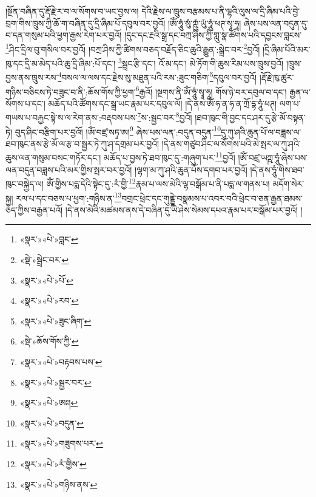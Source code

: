 །སྔོན་བཞིན་དུ་རྡོ་རྗེ་ར་བ་ལ་སོགས་བ་ཡང་བྱས་ལ། དེའི་རྗེས་ལ་ཁྲུས་བརྩམས་པ་ནི་ལྷའི་ལུས་ལ་དྲི་ཞིམ་པའི་བྱེ་བྲག་གིས་ཁྲུས་ཀྱི་ཆོ་ག་བཞིན་དུ་དྲི་ཞིམ་པོ་དབུལ་བར་བྱའོ། །ཨོཾ་ཧཱུཾ་སུཾ་ཀྵུཾ་ཡུཾ་ཧཱུཾ་ཕཊ་སྭཱ་ཧཱ། ཞེས་པས་ལན་བདུན་དུ་བ་དན་གསུམ་པའི་ཕྱག་རྒྱས་རེག་པར་བྱའོ། །དུང་དང་རྔའི་སྒྲ་དང་བཀྲ་ཤིས་ཀྱི་གླུ་སྣ་ཚོགས་པའི་དབྱངས་བླངས་\footnote{«སྣར་»«པེ་»བླང་}ཤིང་དྲིལ་བུ་གསིལ་བར་བྱའོ། །བཀྲ་ཤིས་ཀྱི་ཚིགས་བཅད་བརྗོད་ཅིང་ཆུའི་རྒྱུན་:སྒྲེང་བར་\footnote{«སྡེ་»སྦྲེང་བར་}བྱའོ། །དྲི་ཞིམ་པོའི་མར་ཁུ་དང་དྲི་མ་མེད་པའི་ཆུ་དྲི་ཞིམ་:པོ་དང་། \footnote{«སྣར་»«པེ་»པོ་}སྦྲང་རྩི་དང་། འོ་མ་དང་། མེ་ཏོག་གི་ཆུས་རིམ་པས་ཁྲུས་བྱའོ། །ཁྲུས་བྱས་ནས་ཁྲུས་རས་\footnote{«སྣར་»«པེ་»རབ་}བསལ་ལ་ལས་དང་རྗེས་སུ་མཐུན་པའི་རས་:ཟུང་གཅིག་\footnote{«སྣར་»«པེ་»ཟུང་ཞིག་}དབུལ་བར་བྱའོ། །རྡོ་རྗེ་ཁུ་ཚུར་གཉིས་བཅིངས་ཏེ་བཟུང་བ་ནི་:ཆོས་གོས་ཀྱི་ཕྱག་\footnote{«སྡེ་»ཆོས་གོས་ཀྱི་}རྒྱའོ། །སྔགས་ནི་ཨོཾ་ཧཱུཾ་སྭཱ་ཧཱ། གོས་ཉེ་བར་དབུལ་བ་དང་། རྒྱན་ལ་སོགས་པ་དང་། མཆོད་པའི་ཚོགས་དང་སྒྲ་ཡང་རྣམ་པར་དབུལ་ལོ། །དེ་ནས་ཨོཾ་ཧ་ན་ཧ་ན་ཀྲོ་དྷ་ཧཱུཾ་ཕཊ། ལག་པ་གཡས་པ་བརྐྱང་སྟེ་ས་ལ་རེག་ནས་:བརྡབས་པས་\footnote{«སྣར་»«པེ་»བརྟབས་པས་}ས་:སྦྱང་བར་\footnote{«སྣར་»«པེ་»སྦྱར་བར་}བྱའོ། །ཐབ་ཁུང་གི་བྱང་དང་ཤར་དུ་རྩེ་མོ་བསྟན་ཏེ། བུད་ཤིང་བརྩིག་པར་བྱའོ། །ཨོཾ་བཛྲ་སཏྭ་ཨ།\footnote{«སྣར་»«པེ་»ཨཿ།} ཞེས་པས་ལན་:བདུན་བདུན་\footnote{«སྣར་»«པེ་»བདུན་}དུ་ཀུ་ཤའི་ཆུན་པོ་ལ་བཟླས་ལ་ཐབ་ཁུང་ནས་རྩེ་མོ་ལ་རྩ་བ་སྦྱར་ཏེ་ཀུ་ཤ་དགྲམ་པར་བྱའོ། །དེ་ནས་གཙུབ་ཤིང་ལ་སོགས་པའི་མེ་སྤར་ལ་ཀུ་ཤའི་ཆུས་ལན་གསུམ་བསང་གཏོར་དང་། མཆོད་པ་བྱས་ཏེ་ཐབ་ཁུང་དུ་:གཞུག་པར་\footnote{«སྣར་»«པེ་»གཟུགས་པར་}བྱའོ། །ཨོཾ་བཛྲ་ཡཀྵ་ཧཱུཾ་ཞེས་པས་ལན་བདུན་བཟླས་པའི་མར་གྱིས་སྤར་བར་བྱའོ། །ལྷག་མ་ཀུ་ཤའི་ཆུན་པོས་དགབ་པར་བྱའོ། །དེ་ནས་ཧཱུཾ་གིས་ཐབ་ཁུང་བསྐྱེད་ལ། ཨོཾ་གྱིས་པདྨ་དེའི་སྟེང་དུ་:རཾ་གྱི་\footnote{«སྣར་»«པེ་»རཾ་གྱིས་}རྣམ་པ་ལས་མེའི་ལྷ་བསྒོམ་པ་ནི་པདྨ་ལ་གནས་པ། མདོག་སེར་སྐྱ། རལ་པ་དང་བཅས་པ་ཕྱག་:གཉིས་ན་\footnote{«སྣར་»«པེ་»གཉིས་ནས་}བགྲང་ཕྲེང་དང་གུནྡྷེ་བསྣམས་པ་འབར་བའི་ཕྲེང་བ་ཅན་རྒྱན་ཐམས་ཅད་ཀྱིས་བརྒྱན་པའོ། །དེ་ནས་མེའི་མཚམས་ནས་དེ་བཞིན་དུ་ཡེ་ཤེས་སེམས་དཔའ་རྣམ་པར་བསྒོམ་པར་བྱའོ། །
